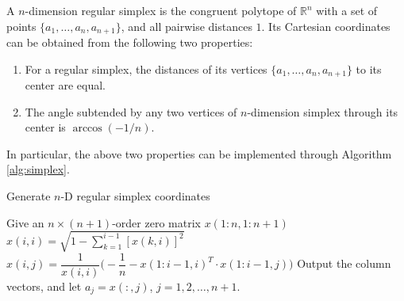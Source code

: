 \documentclass[final,1p,times]{elsarticle}
\begin{document}
A $n$-dimension regular simplex is the congruent polytope of
$\mathbb{R}^n$ with a set of points $\{a_1,\dots,a_n,a_{n+1}\}$,
and all pairwise distances $1$.
Its Cartesian coordinates can be obtained from the following two properties:
\begin{enumerate}
	\item For a regular simplex, the distances of its vertices 
		$\{a_1,\dots,a_n,a_{n+1}\}$ to its center are equal.
	\item The angle subtended by any two vertices of $n$-dimension simplex through its center is
		$\arccos(-1/n)$.
\end{enumerate}
In particular, the above two properties can be implemented
through Algorithm \ref{alg:simplex}.
\begin{algorithm}
	\caption{Generate $n$-D regular simplex coordinates} 
	\label{alg:simplex}
\begin{algorithmic}
	\STATE Give an $n\times(n+1)$-order zero matrix $x(1:n,1:n+1)$
	\STATE $x(i,i)=\sqrt{1-\sum_{k=1}^{i-1} [x(k, i)]^{2}}$
		\STATE $x(i,j)
		=\dfrac{1}{x(i,i)}\Big(-\dfrac{1}{n}-x(1:i-1, i)^T \cdot
		x(1:i-1, j)\Big)$
		\ENDFOR
	\ENDFOR
	\STATE Output the column vectors, and let $a_j=x(:,j)$,
	$j=1,2,\dots,n+1$. 
\end{algorithmic}
\end{algorithm}
\end{document}
